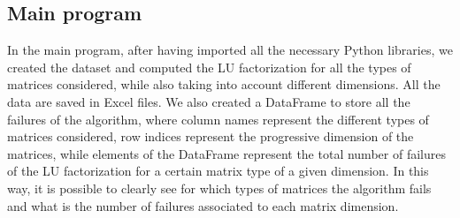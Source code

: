 \documentclass[a4paper,11pt]{article}
\begin{document}
\subsection{Main program}\label{subsect:Main_Program}
In the main program, after having imported all the necessary Python libraries, we created the dataset and computed the LU factorization for all the types of matrices considered, while also taking into account different dimensions. All the data are saved in Excel files. We also created a DataFrame to store all the failures of the algorithm, where column names represent the different types of matrices considered, row indices represent the progressive dimension of the matrices, while elements of the DataFrame represent the total number of failures of the LU factorization for a certain matrix type of a given dimension. In this way, it is possible to clearly see for which types of matrices the algorithm fails and what is the number of failures associated to each matrix dimension.
\end{document}
